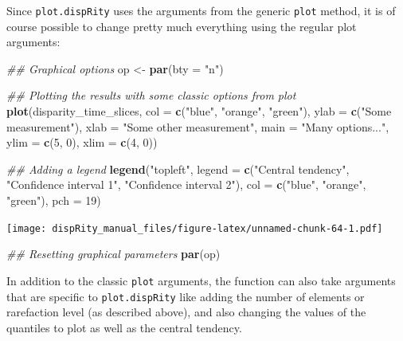 \documentclass[]{book}
\newenvironment{Shaded}{\begin{snugshade}}{\end{snugshade}}
\newcommand{\CommentTok}[1]{\textcolor[rgb]{0.56,0.35,0.01}{\textit{#1}}}
\newcommand{\DataTypeTok}[1]{\textcolor[rgb]{0.13,0.29,0.53}{#1}}
\newcommand{\DecValTok}[1]{\textcolor[rgb]{0.00,0.00,0.81}{#1}}
\newcommand{\KeywordTok}[1]{\textcolor[rgb]{0.13,0.29,0.53}{\textbf{#1}}}
\newcommand{\NormalTok}[1]{#1}
\newcommand{\StringTok}[1]{\textcolor[rgb]{0.31,0.60,0.02}{#1}}
\begin{document}
Since \texttt{plot.dispRity} uses the arguments from the generic \texttt{plot} method, it is of course possible to change pretty much everything using the regular plot arguments:

\begin{Shaded}
\begin{Highlighting}[]
\CommentTok{## Graphical options}
\NormalTok{op <-}\StringTok{ }\KeywordTok{par}\NormalTok{(}\DataTypeTok{bty =} \StringTok{"n"}\NormalTok{)}

\CommentTok{## Plotting the results with some classic options from plot}
\KeywordTok{plot}\NormalTok{(disparity_time_slices, }\DataTypeTok{col =} \KeywordTok{c}\NormalTok{(}\StringTok{"blue"}\NormalTok{, }\StringTok{"orange"}\NormalTok{, }\StringTok{"green"}\NormalTok{),}
    \DataTypeTok{ylab =} \KeywordTok{c}\NormalTok{(}\StringTok{"Some measurement"}\NormalTok{), }\DataTypeTok{xlab =} \StringTok{"Some other measurement"}\NormalTok{,}
    \DataTypeTok{main =} \StringTok{"Many options..."}\NormalTok{, }\DataTypeTok{ylim =} \KeywordTok{c}\NormalTok{(}\DecValTok{5}\NormalTok{, }\DecValTok{0}\NormalTok{), }\DataTypeTok{xlim =} \KeywordTok{c}\NormalTok{(}\DecValTok{4}\NormalTok{, }\DecValTok{0}\NormalTok{))}

\CommentTok{## Adding a legend}
\KeywordTok{legend}\NormalTok{(}\StringTok{"topleft"}\NormalTok{, }\DataTypeTok{legend =} \KeywordTok{c}\NormalTok{(}\StringTok{"Central tendency"}\NormalTok{,}
                             \StringTok{"Confidence interval 1"}\NormalTok{,}
                             \StringTok{"Confidence interval 2"}\NormalTok{),}
      \DataTypeTok{col =} \KeywordTok{c}\NormalTok{(}\StringTok{"blue"}\NormalTok{, }\StringTok{"orange"}\NormalTok{, }\StringTok{"green"}\NormalTok{), }\DataTypeTok{pch =} \DecValTok{19}\NormalTok{)}
\end{Highlighting}
\end{Shaded}

\texttt{[image: dispRity\_manual\_files/figure-latex/unnamed-chunk-64-1.pdf]}

\begin{Shaded}
\begin{Highlighting}[]
\CommentTok{## Resetting graphical parameters}
\KeywordTok{par}\NormalTok{(op)}
\end{Highlighting}
\end{Shaded}

In addition to the classic \texttt{plot} arguments, the function can also take arguments that are specific to \texttt{plot.dispRity} like adding the number of elements or rarefaction level (as described above), and also changing the values of the quantiles to plot as well as the central tendency.
\end{document}
